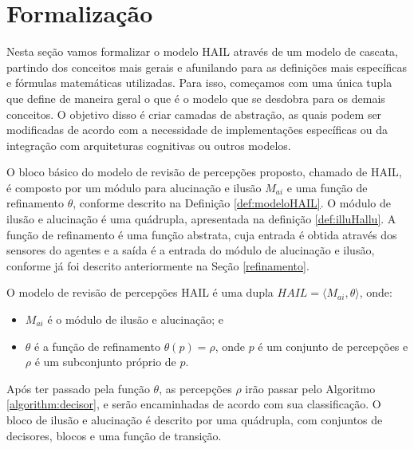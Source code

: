 \section{Formalização}

\label{section:formalizacao}

Nesta seção vamos formalizar o modelo HAIL através de um modelo de cascata, partindo dos conceitos mais gerais e afunilando para as definições mais específicas e fórmulas matemáticas utilizadas. Para isso, começamos com uma única tupla que define de maneira geral o que é o modelo que se desdobra para os demais conceitos. O objetivo disso é criar camadas de abstração, as quais podem ser modificadas de acordo com a necessidade de implementações específicas ou da integração com arquiteturas cognitivas ou outros modelos.

 O bloco básico do modelo de revisão de percepções proposto, chamado de HAIL, é composto por um módulo para alucinação e ilusão $M_{ai}$ e uma função de refinamento $\theta$, conforme descrito na Definição \ref{def:modeloHAIL}. O módulo de ilusão e alucinação é uma quádrupla, apresentada na definição \ref{def:illuHallu}. A função de refinamento é uma função abstrata, cuja entrada é obtida através dos sensores do agentes e a saída é a entrada do módulo de alucinação e ilusão, conforme já foi descrito anteriormente na Seção \ref{refinamento}.
 
 \begin{definition}{}
    O modelo de revisão de percepções HAIL é uma dupla $HAIL = \langle M_{ai}, \theta \rangle$, onde:
    
    \begin{itemize}
        \item $M_{ai}$ é o módulo de ilusão e alucinação; e
        \item $\theta$ é a função de refinamento $\theta(p) = \rho$, onde $p$ é um conjunto de percepções e $\rho$ é um subconjunto próprio de $p$.
    \end{itemize}{}
    \label{def:modeloHAIL}
\end{definition}

Após ter passado pela função $\theta$, as percepções $\rho$ irão passar pelo Algoritmo \ref{algorithm:decisor}, e serão encaminhadas de acordo com sua classificação. O bloco de ilusão e alucinação é descrito por uma quádrupla, com conjuntos de decisores, blocos e uma função de transição.

